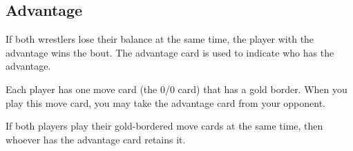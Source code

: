 \subsection*{Advantage}
If both wrestlers lose their balance at the same time,
the player with the advantage wins the bout.
The advantage card is used to indicate who has the advantage.

Each player has one move card (the 0/0 card) that has a gold border.
When you play this move card, you may take the advantage card from your opponent. 

If both players play their gold-bordered move cards at the same time, 
then whoever has the advantage card retains it.